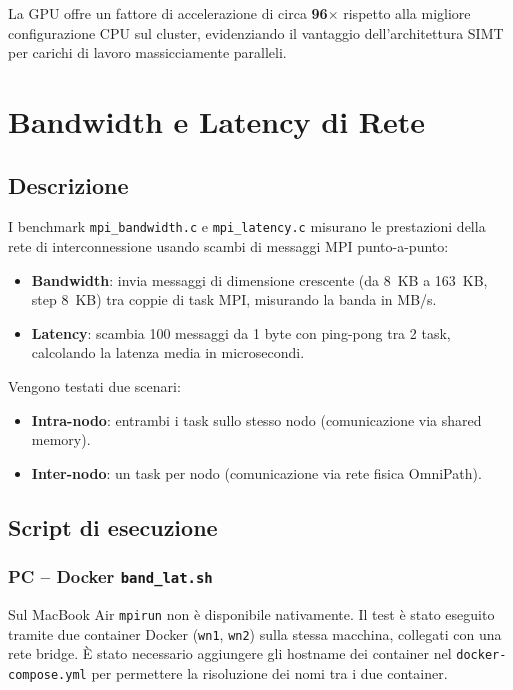 \documentclass[a4paper,12pt]{article}
\begin{document}
La GPU offre un fattore di accelerazione di circa \textbf{96$\times$} rispetto alla migliore configurazione CPU sul cluster, evidenziando il vantaggio dell'architettura SIMT per carichi di lavoro massicciamente paralleli.

\section{Bandwidth e Latency di Rete}

\subsection{Descrizione}

I benchmark \texttt{mpi\_bandwidth.c} e \texttt{mpi\_latency.c} misurano le prestazioni della rete di interconnessione usando scambi di messaggi MPI punto-a-punto:

\begin{itemize}
    \item \textbf{Bandwidth}: invia messaggi di dimensione crescente (da 8~KB a 163~KB, step 8~KB) tra coppie di task MPI, misurando la banda in MB/s.
    \item \textbf{Latency}: scambia 100 messaggi da 1 byte con ping-pong tra 2 task, calcolando la latenza media in microsecondi.
\end{itemize}

Vengono testati due scenari:
\begin{itemize}
    \item \textbf{Intra-nodo}: entrambi i task sullo stesso nodo (comunicazione via shared memory).
    \item \textbf{Inter-nodo}: un task per nodo (comunicazione via rete fisica OmniPath).
\end{itemize}

\subsection{Script di esecuzione}

\subsubsection{PC -- Docker \texttt{band\_lat.sh}}

Sul MacBook Air \texttt{mpirun} non \`e disponibile nativamente. Il test \`e stato eseguito tramite due container Docker (\texttt{wn1}, \texttt{wn2}) sulla stessa macchina, collegati con una rete bridge. È stato necessario aggiungere gli hostname dei container nel \texttt{docker-compose.yml} per permettere la risoluzione dei nomi tra i due container.
\end{document}
